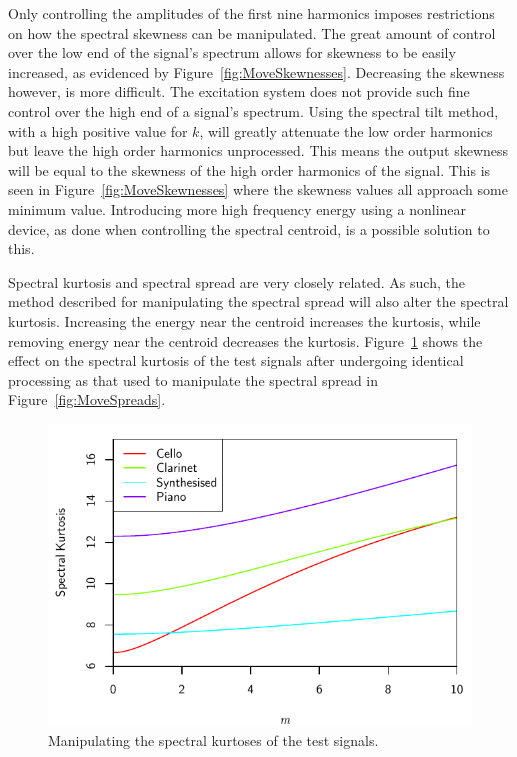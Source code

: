 			Only controlling the amplitudes of the first nine harmonics imposes restrictions on how the
			spectral skewness can be manipulated. The great amount of control over the low end of the signal's
			spectrum allows for skewness to be easily increased, as evidenced by
			Figure~\ref{fig:MoveSkewnesses}.  Decreasing the skewness however, is more difficult. The
			excitation system does not provide such fine control over the high end of a signal's spectrum.
			Using the spectral tilt method, with a high positive value for $k$, will greatly attenuate the low
			order harmonics but leave the high order harmonics unprocessed. This means the output skewness will
			be equal to the skewness of the high order harmonics of the signal. This is seen in
			Figure~\ref{fig:MoveSkewnesses} where the skewness values all approach some minimum value.
			Introducing more high frequency energy using a nonlinear device, as done when controlling the
			spectral centroid, is a possible solution to this.

			Spectral kurtosis and spectral spread are very closely related. As such, the method described for
			manipulating the spectral spread will also alter the spectral kurtosis. Increasing the energy near
			the centroid increases the kurtosis, while removing energy near the centroid decreases the
			kurtosis.  Figure~\ref{fig:MoveKurtoses} shows the effect on the spectral kurtosis of the test
			signals after undergoing identical processing as that used to manipulate the spectral spread in
			Figure~\ref{fig:MoveSpreads}.
			
			\begin{figure}[h!]
				\centering
				\includegraphics{chapter6/Images/MoveKurtoses.pdf}
				\caption{Manipulating the spectral kurtoses of the test signals.}
				\label{fig:MoveKurtoses}
			\end{figure}

